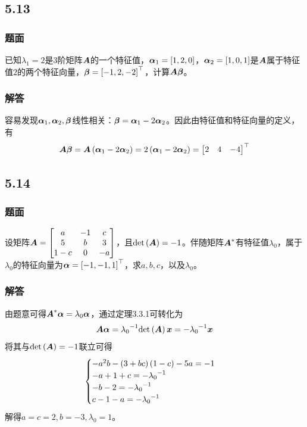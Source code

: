 \documentclass{beamer}
\begin{document}
\subsection*{5.13}
\begin{frame}
    \frametitle{题面}
    已知\(\lambda_1=2\)是\(3\)阶矩阵\(\boldsymbol{A}\)的一个特征值，\(\boldsymbol{\alpha}_1=\left[ 1,2,0 \right]\)，\(\boldsymbol{\alpha}_2=\left[ 1,0,1 \right]\)是\(\boldsymbol{A}\)属于特征值\(2\)的两个特征向量，\(\boldsymbol{\beta}=\left[ -1,2,-2 \right]^\top\)，计算\(\boldsymbol{A}\boldsymbol{\beta}\)。
\end{frame}

\begin{frame}
    \frametitle{解答}
    容易发现\(\boldsymbol{\alpha}_1,\boldsymbol{\alpha}_2,\boldsymbol{\beta}\)线性相关：\(\boldsymbol{\beta}=\boldsymbol{\alpha}_1-2\boldsymbol{\alpha}_2\)。因此由特征值和特征向量的定义，有
    \begin{equation*}
        \boldsymbol{A}\boldsymbol{\beta}=\boldsymbol{A}\left( \boldsymbol{\alpha}_1-2\boldsymbol{\alpha}_2 \right)=2\left( \boldsymbol{\alpha}_1-2\boldsymbol{\alpha}_2 \right)=\begin{bmatrix}2&4&-4\end{bmatrix}^\top
    \end{equation*}
\end{frame}

\subsection*{5.14}
\begin{frame}
    \frametitle{题面}
    设矩阵\(\boldsymbol{A}=\begin{bmatrix}a&-1&c\\5&b&3\\1-c&0&-a\end{bmatrix}\)，且\(\mathrm{det}\left( \boldsymbol{A} \right)=-1\)。伴随矩阵\(\boldsymbol{A}^*\)有特征值\(\lambda_0\)，属于\(\lambda_0\)的特征向量为\(\boldsymbol{\alpha}=\left[ -1,-1,1 \right]^\top\)，求\(a,b,c\)，以及\(\lambda_0\)。
\end{frame}

\begin{frame}
    \frametitle{解答}
    由题意可得\(\boldsymbol{A}^*\boldsymbol{\alpha}=\lambda_0\boldsymbol{\alpha}\)，通过定理3.3.1可转化为
    \begin{equation*}
        \boldsymbol{A}\boldsymbol{\alpha}={\lambda_0}^{-1}\mathrm{det}\left( \boldsymbol{A} \right)\boldsymbol{x}=-{\lambda_0}^{-1}\boldsymbol{x}
    \end{equation*}
    \pause
    将其与\(\mathrm{det}\left( \boldsymbol{A} \right)=-1\)联立可得
    \begin{equation*}
        \begin{cases}
            -a^2b-\left( 3+bc \right)\left( 1-c \right)-5a=-1 \\
            -a+1+c=-{\lambda_0}^{-1}             \\
            -b-2=-{\lambda_0}^{-1}               \\
            c-1-a=-{\lambda_0}^{-1}
        \end{cases}
    \end{equation*}
    \pause
    解得\(a=c=2,b=-3,\lambda_0=1\)。
\end{frame}
\end{document}
